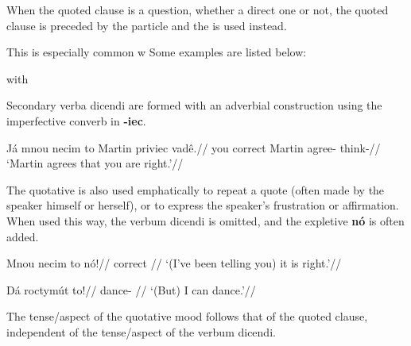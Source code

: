 When the quoted clause is a question, whether a direct one or not, the quoted clause is preceded by the particle  and the  is used instead.


This is especially common w
Some examples are listed below:

\ex with 
\xe

\par Secondary verba dicendi are formed with an adverbial construction using the imperfective converb in \textbf{-iec}.

\pex
\begingl
\gla Já mnou necim to Martin priviec vadê.//
\glb you correct   Martin agree- think-//
\glft `Martin agrees that you are right.'//
\endgl
\xe

\par The quotative is also used emphatically to repeat a quote (often made by the speaker himself or herself), or to express the speaker's frustration or affirmation. When used this way, the verbum dicendi is omitted, and the expletive \textbf{nó} is often added.

\pex
\begingl
\gla Mnou necim to nó!//
\glb correct   //
\glft `(I've been telling you) it is right.'//
\endgl
\xe

\pex
\begingl
\gla Dá roctymút to!//
\glb {} dance- //
\glft `(But) I can dance.'//
\endgl
\xe

\par The tense/aspect of the quotative mood follows that of the quoted clause, independent of the tense/aspect of the verbum dicendi.
